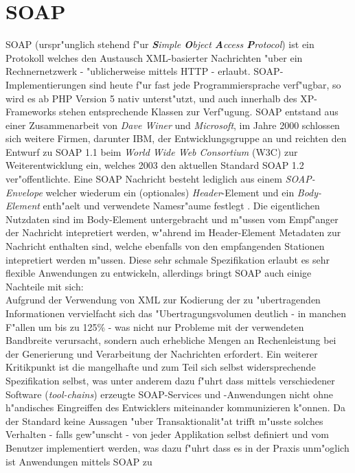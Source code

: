 \section{SOAP}
\label{sec:background:soap}
SOAP (urspr"unglich stehend f"ur \emph{\textbf{S}imple \textbf{O}bject \textbf{A}ccess \textbf{P}rotocol})
ist ein Protokoll welches den Austausch XML-basierter Nachrichten "uber ein Rechnernetzwerk - "ublicherweise
mittels HTTP - erlaubt. SOAP-Implementierungen sind heute f"ur fast jede Programmiersprache verf"ugbar, so wird es
ab PHP Version 5 nativ unterst"utzt, und auch innerhalb des XP-Frameworks stehen entsprechende Klassen zur Verf"ugung.
SOAP entstand aus einer Zusammenarbeit von \emph{Dave Winer} und \emph{Microsoft}, im Jahre 2000 schlossen sich 
weitere Firmen, darunter IBM, der Entwicklungsgruppe an und reichten den Entwurf zu SOAP 1.1 beim 
\emph{World Wide Web Consortium} (W3C) zur Weiterentwicklung ein, welches 2003 den aktuellen Standard SOAP 1.2
ver"offentlichte.
Eine SOAP Nachricht besteht lediglich aus einem \emph{SOAP-Envelope} welcher wiederum ein (optionales) \emph{Header}-Element
und ein \emph{Body-Element} enth"aelt und verwendete Namesr"aume festlegt \cite{SOAPSPEC}. Die eigentlichen Nutzdaten sind
im Body-Element untergebracht und m"ussen vom Empf"anger der Nachricht intepretiert werden, w"ahrend im Header-Element Metadaten
zur Nachricht enthalten sind, welche ebenfalls von den empfangenden Stationen intepretiert werden m"ussen. Diese sehr schmale
Spezifikation erlaubt es sehr flexible Anwendungen zu entwickeln, allerdings bringt SOAP auch einige Nachteile mit sich:\\
Aufgrund der Verwendung von XML zur Kodierung der zu "ubertragenden Informationen vervielfacht sich das "Ubertragungsvolumen
deutlich - in manchen F"allen um bis zu 125\% - was nicht nur Probleme mit der verwendeten Bandbreite verursacht, sondern auch
erhebliche Mengen an Rechenleistung bei der Generierung und Verarbeitung der Nachrichten erfordert. Ein weiterer Kritikpunkt ist
die mangelhafte und zum Teil sich selbst widersprechende Spezifikation selbst, was unter anderem dazu f"uhrt dass mittels verschiedener
Software (\emph{tool-chains}) erzeugte SOAP-Services und -Anwendungen nicht ohne h"andisches Eingreiffen des Entwicklers miteinander kommunizieren 
k"onnen.
Da der Standard keine Aussagen "uber Transaktionalit"at trifft m"usste solches Verhalten - falls gew"unscht - von jeder Applikation selbst
definiert und vom Benutzer implementiert werden, was dazu f"uhrt dass es in der Praxis unm"oglich ist Anwendungen mittels SOAP zu
